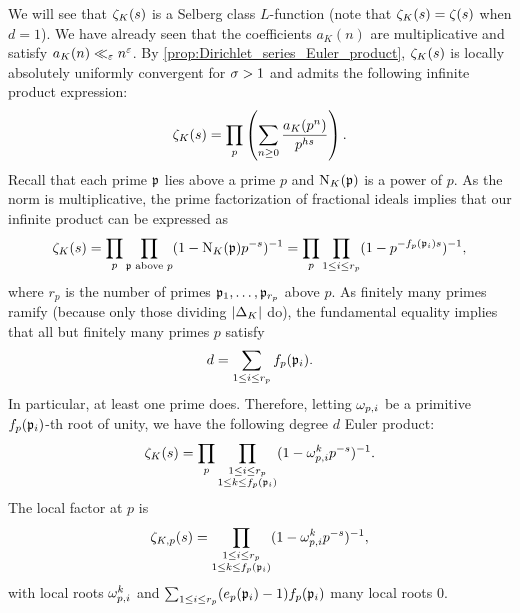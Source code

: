       We will see that $\zeta_{K}(s)$ is a Selberg class $L$-function (note that $\zeta_{K}(s) = \zeta(s)$ when $d = 1$). We have already seen that the coefficients $a_{K}(n)$ are multiplicative and satisfy $a_{K}(n) \ll_{\varepsilon} n^{\varepsilon}$. By \cref{prop:Dirichlet_series_Euler_product}, $\zeta_{K}(s)$ is locally absolutely uniformly convergent for $\sigma > 1$ and admits the following infinite product expression:
      \[
        \zeta_{K}(s) = \prod_{p}\left(\sum_{n \ge 0}\frac{a_{K}(p^{n})}{p^{hs}}\right).
      \]
      Recall that each prime $\mathfrak{p}$ lies above a prime $p$ and $\operatorname{\mathrm{N}}_{K}(\mathfrak{p})$ is a power of $p$. As the norm is multiplicative, the prime factorization of fractional ideals implies that our infinite product can be expressed as
      \[
        \zeta_{K}(s) = \prod_{p}\prod_{\text{$\mathfrak{p}$ above $p$}}(1-\operatorname{\mathrm{N}}_{K}(\mathfrak{p})p^{-s})^{-1} = \prod_{p}\prod_{1 \le i \le r_{p}}(1-p^{-f_{p}(\mathfrak{p}_{i})s})^{-1},
      \]
      where $r_{p}$ is the number of primes $\mathfrak{p}_{1},\ldots,\mathfrak{p}_{r_{p}}$ above $p$. As finitely many primes ramify (because only those dividing $|\Delta_{K}|$ do), the fundamental equality implies that all but finitely many primes $p$ satisfy
      \[
        d = \sum_{1 \le i \le r_{p}}f_{p}(\mathfrak{p}_{i}).
      \]
      In particular, at least one prime does. Therefore, letting $\omega_{p,i}$ be a primitive $f_{p}(\mathfrak{p}_{i})$-th root of unity, we have the following degree $d$ Euler product:
      \[
        \zeta_{K}(s) = \prod_{p}\prod_{\substack{1 \le i \le r_{p} \\ 1 \le k \le f_{p}(\mathfrak{p}_{i})}}(1-\omega_{p,i}^{k}p^{-s})^{-1}.
      \]
      The local factor at $p$ is
      \[
        \zeta_{K,p}(s) = \prod_{\substack{1 \le i \le r_{p} \\ 1 \le k \le f_{p}(\mathfrak{p}_{i})}}(1-\omega_{p,i}^{k}p^{-s})^{-1},
      \]
      with local roots $\omega_{p,i}^{k}$ and $\sum_{1 \le i \le r_{p}}(e_{p}(\mathfrak{p}_{i})-1)f_{p}(\mathfrak{p}_{i})$ many local roots $0$.
